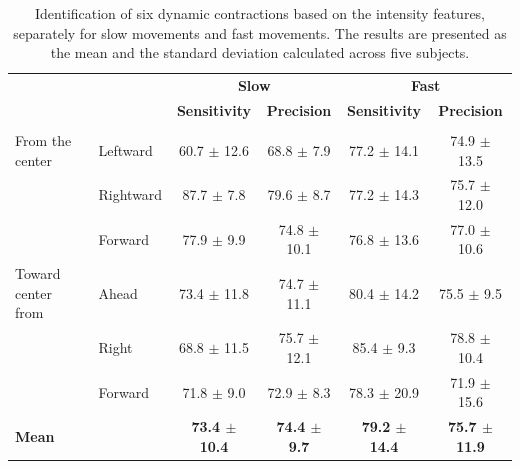 \begin{table}[]
\centering
\caption{Identification of six dynamic contractions based on the intensity features, separately for slow movements and fast movements. The results are presented as the mean and the standard deviation calculated across five subjects.}
\label{tb:4-3}
\begin{tabular}{llcccc}
                   &           & \multicolumn{2}{c}{\textbf{Slow}}          & \multicolumn{2}{c}{\textbf{Fast}}           \\
                   &           & \textbf{Sensitivity} & \textbf{Precision}  & \textbf{Sensitivity} & \textbf{Precision}   \\ \hline
                   &           &                      &                     &                      &                      \\
From the center    & Leftward  & 60.7 $\pm$ 12.6          & 68.8 $\pm$ 7.9          & 77.2 $\pm$ 14.1          & 74.9 $\pm$ 13.5          \\
                   & Rightward & 87.7 $\pm$ 7.8           & 79.6 $\pm$ 8.7          & 77.2 $\pm$ 14.3          & 75.7 $\pm$ 12.0          \\
                   & Forward   & 77.9 $\pm$ 9.9           & 74.8 $\pm$ 10.1         & 76.8 $\pm$ 13.6          & 77.0 $\pm$ 10.6          \\ \hline
Toward center from & Ahead     & 73.4 $\pm$ 11.8          & 74.7 $\pm$ 11.1         & 80.4 $\pm$ 14.2          & 75.5 $\pm$ 9.5           \\
                   & Right     & 68.8 $\pm$ 11.5          & 75.7 $\pm$ 12.1         & 85.4 $\pm$ 9.3           & 78.8 $\pm$ 10.4          \\
                   & Forward   & 71.8 $\pm$ 9.0           & 72.9 $\pm$ 8.3          & 78.3 $\pm$ 20.9          & 71.9 $\pm$ 15.6          \\ \hline
\textbf{Mean}      & \textbf{} & \textbf{73.4 $\pm$ 10.4} & \textbf{74.4 $\pm$ 9.7} & \textbf{79.2 $\pm$ 14.4} & \textbf{75.7 $\pm$ 11.9}
\end{tabular}
\end{table}


